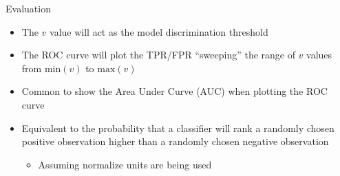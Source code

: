 \begin{frame}{Evaluation}
    \begin{itemize}
        \item The $v$ value will act as the model discrimination threshold
        \item The ROC curve will plot the TPR/FPR ``sweeping'' the range of $v$ values from $\text{min}(v)$ to $\text{max}(v)$
        \item Common to show the Area Under Curve (AUC) when plotting the ROC curve
        \item Equivalent to the probability that a classifier will rank a randomly chosen positive observation higher than a randomly chosen negative observation \cite{article:roc-analysis}
            \begin{itemize}
                \item Assuming normalize units are being used
            \end{itemize}
    \end{itemize}
\end{frame}